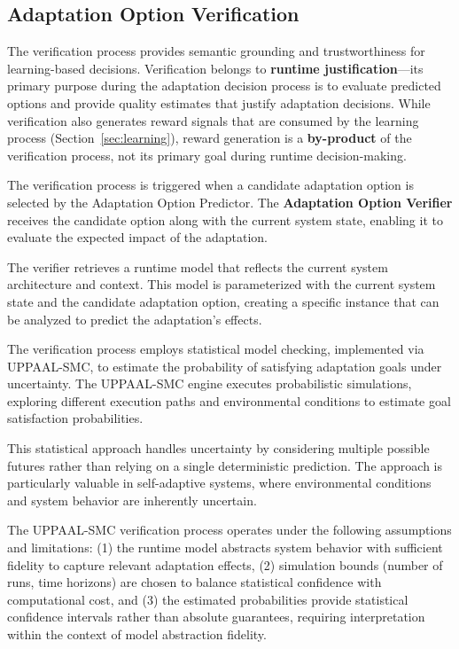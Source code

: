 \documentclass[11pt,a4paper]{article}
\begin{document}
\subsection{Adaptation Option Verification}
\label{subsec:verification}

The verification process provides semantic grounding and trustworthiness for learning-based decisions. Verification belongs to \textbf{runtime justification}---its primary purpose during the adaptation decision process is to evaluate predicted options and provide quality estimates that justify adaptation decisions. While verification also generates reward signals that are consumed by the learning process (Section~\ref{sec:learning}), reward generation is a \textbf{by-product} of the verification process, not its primary goal during runtime decision-making.

The verification process is triggered when a candidate adaptation option is selected by the Adaptation Option Predictor. The \textbf{Adaptation Option Verifier} receives the candidate option along with the current system state, enabling it to evaluate the expected impact of the adaptation.

The verifier retrieves a runtime model that reflects the current system architecture and context. This model is parameterized with the current system state and the candidate adaptation option, creating a specific instance that can be analyzed to predict the adaptation's effects.

The verification process employs statistical model checking, implemented via UPPAAL-SMC, to estimate the probability of satisfying adaptation goals under uncertainty. The UPPAAL-SMC engine executes probabilistic simulations, exploring different execution paths and environmental conditions to estimate goal satisfaction probabilities.

This statistical approach handles uncertainty by considering multiple possible futures rather than relying on a single deterministic prediction. The approach is particularly valuable in self-adaptive systems, where environmental conditions and system behavior are inherently uncertain.

The UPPAAL-SMC verification process operates under the following assumptions and limitations: (1) the runtime model abstracts system behavior with sufficient fidelity to capture relevant adaptation effects, (2) simulation bounds (number of runs, time horizons) are chosen to balance statistical confidence with computational cost, and (3) the estimated probabilities provide statistical confidence intervals rather than absolute guarantees, requiring interpretation within the context of model abstraction fidelity.
\end{document}
